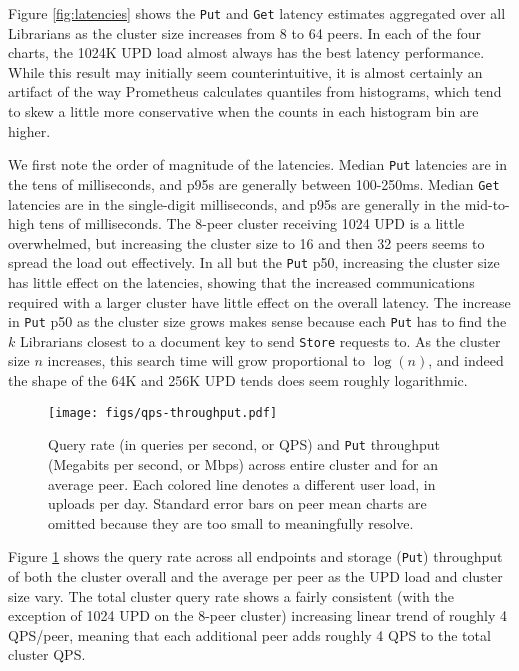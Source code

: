 \documentclass[10pt]{article}
\newcommand{\ttt}[1]{\texttt{#1}}
\def\Put{\ttt{Put}}
\begin{document}
Figure \ref{fig:latencies} shows the \ttt{Put} and \texttt{Get} latency estimates aggregated over all Librarians as the cluster size increases from 8 to 64 peers. In each of the four charts, the 1024K UPD load almost always has the best latency performance. While this result may initially seem counterintuitive, it is almost certainly an artifact of the way Prometheus calculates quantiles from histograms, which tend to skew a little more conservative when the counts in each histogram bin are higher. 

We first note the order of magnitude of the latencies. Median \ttt{Put} latencies are in the tens of milliseconds, and p95s are generally between 100-250ms. Median \texttt{Get} latencies are in the single-digit milliseconds, and p95s are generally in the mid-to-high tens of milliseconds. The 8-peer cluster receiving 1024 UPD is a little overwhelmed, but increasing the cluster size to 16 and then 32 peers seems to spread the load out effectively. In all but the \texttt{Put} p50, increasing the cluster size has little effect on the latencies, showing that the increased communications required with a larger cluster have little effect on the overall latency. The increase in \texttt{Put} p50 as the cluster size grows makes sense because each \texttt{Put} has to find the $k$ Librarians closest to a document key to send \texttt{Store} requests to. As the cluster size $n$ increases, this search time will grow proportional to $\log(n)$, and indeed the shape of the 64K and 256K UPD tends does seem roughly logarithmic. 

\begin{figure}[t]
	\centering
	\texttt{[image: figs/qps-throughput.pdf]}
	\caption{Query rate (in queries per second, or QPS) and \Put{} throughput (Megabits per second, or Mbps) across entire cluster and for an average peer. Each colored line denotes a different user load, in uploads per day. Standard error bars on peer mean charts are omitted because they are too small to meaningfully resolve.}
	\label{fig:ratethroughput}
\end{figure}

Figure \ref{fig:ratethroughput} shows the query rate across all endpoints and storage (\Put{}) throughput of both the cluster overall and the average per peer as the UPD load and cluster size vary. The total cluster query rate shows a fairly consistent (with the exception of 1024 UPD on the 8-peer cluster) increasing linear trend of roughly 4 QPS/peer, meaning that each additional peer adds roughly 4 QPS to the total cluster QPS.
\end{document}
